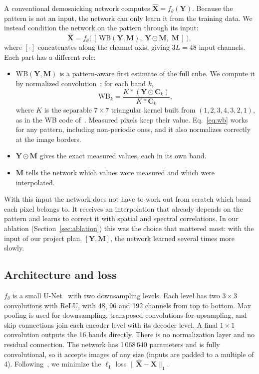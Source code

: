 \documentclass{article}
\def\X{{\mathbf X}}
\def\Y{{\mathbf Y}}
\def\C{{\mathbf C}}
\def\M{{\mathbf M}}
\newcommand{\wb}{\mathrm{WB}}
\begin{document}
A conventional demosaicking network computes $\hat\X=f_\theta(\Y)$. Because
the pattern is not an input, the network can only learn it from the training
data. We instead condition the network on the pattern through its input:
\begin{equation}
  \hat\X = f_\theta\big(\,[\,\wb(\Y,\M),\;\Y\odot\M,\;\M\,]\,\big),
  \label{eq:input}
\end{equation}
where $[\cdot]$ concatenates along the channel axis, giving $3L=48$ input
channels. Each part has a different role:
\begin{itemize}
  \item $\wb(\Y,\M)$ is a pattern-aware first estimate of the full cube.
        We compute it by normalized convolution~\cite{knutsson1993}: for
        each band $k$,
        \begin{equation}
          \wb_k = \frac{K * (\Y\odot\C_k)}{K * \C_k},
          \label{eq:wb}
        \end{equation}
        where $K$ is the separable $7\times7$ triangular kernel built from
        $(1,2,3,4,3,2,1)$, as in the WB code of~\cite{diaz2023}. Measured
        pixels keep their value. Eq.~\eqref{eq:wb} works for any pattern,
        including non-periodic ones, and it also normalizes correctly at the
        image borders.
  \item $\Y\odot\M$ gives the exact measured values, each in its own band.
  \item $\M$ tells the network which values were measured and which were
        interpolated.
\end{itemize}
With this input the network does not have to work out from scratch which
band each pixel belongs to. It receives an interpolation that already
depends on the pattern and learns to correct it with spatial and spectral
correlations. In our ablation (Section~\ref{sec:ablation}) this was the
choice that mattered most: with the input of our project plan, $[\Y,\M]$,
the network learned several times more slowly.

\subsection{Architecture and loss}

$f_\theta$ is a small U-Net~\cite{ronneberger2015} with two downsampling
levels. Each level has two $3\times3$ convolutions with ReLU, with 48, 96 and
192 channels from top to bottom. Max pooling is used for downsampling,
transposed convolutions for upsampling, and skip connections join each
encoder level with its decoder level. A final $1\times1$ convolution outputs
the 16 bands directly. There is no normalization layer and no residual
connection. The network has 1\,068\,640 parameters and is fully
convolutional, so it accepts images of any size (inputs are padded to a
multiple of 4). Following~\cite{diaz2023}, we minimize the $\ell_1$ loss
$\|\hat\X-\X\|_1$.
\end{document}
